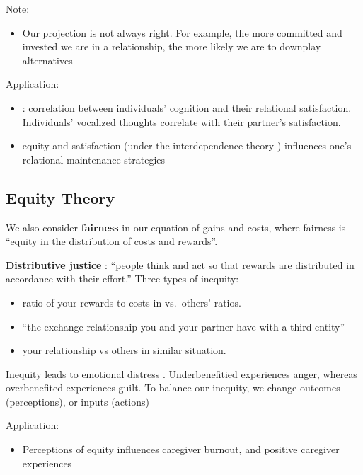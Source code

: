\documentclass[
]{book}
\providecommand{\tightlist}{%
  \setlength{\itemsep}{0pt}\setlength{\parskip}{0pt}}
\begin{document}
Note:

\begin{itemize}
\tightlist
\item
  Our projection is not always right. For example, the more committed and invested we are in a relationship, the more
  likely we are to downplay alternatives \citep{Rusbult_2010}
\end{itemize}

Application:

\begin{itemize}
\tightlist
\item
  \citep{Vangelisti_2013}: correlation between individuals' cognition and their relational satisfaction. Individuals'
  vocalized thoughts correlate with their partner's satisfaction.
\item
  equity and satisfaction (under the interdependence theory ) influences one's relational maintenance strategies
  \citep{Stafford_2006}
\end{itemize}

\hypertarget{equity-theory}{%
\subsection{Equity Theory}\label{equity-theory}}

We also consider \textbf{fairness} in our equation of gains and costs, where fairness is ``equity in the distribution of costs
and rewards''\citep{Baxter_2008}.

\textbf{Distributive justice} \citep{Adams_1965}: ``people think and act so that rewards are distributed in accordance with their
effort.'' Three types of inequity:

\begin{itemize}
\tightlist
\item
  ratio of your rewards to costs in vs.~others' ratios.
\item
  ``the exchange relationship you and your partner have with a third entity''
\item
  your relationship vs others in similar situation.
\end{itemize}

Inequity leads to emotional distress \citep{Sprecher_2001}. Underbenefitied experiences anger, whereas overbenefited
experiences guilt. To balance our inequity, we change outcomes (perceptions), or inputs (actions)

Application:

\begin{itemize}
\tightlist
\item
  Perceptions of equity influences caregiver burnout, and positive caregiver experiences \citep{Ybema_2002}
\end{itemize}
\end{document}
